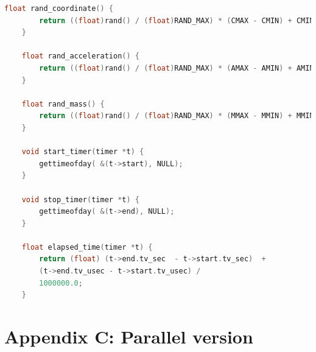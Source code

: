 \documentclass[10pt,a4paper]{article}
\begin{document}
\begin{lstlisting}[language=c]
	float rand_coordinate() {
		return ((float)rand() / (float)RAND_MAX) * (CMAX - CMIN) + CMIN;
	}
	
	float rand_acceleration() {
		return ((float)rand() / (float)RAND_MAX) * (AMAX - AMIN) + AMIN;
	}
	
	float rand_mass() { 
		return ((float)rand() / (float)RAND_MAX) * (MMAX - MMIN) + MMIN;
	}
	
	void start_timer(timer *t) {
		gettimeofday( &(t->start), NULL);
	}
	
	void stop_timer(timer *t) {
		gettimeofday( &(t->end), NULL);
	}
	
	float elapsed_time(timer *t) {
		return (float) (t->end.tv_sec  - t->start.tv_sec)  + 
		(t->end.tv_usec - t->start.tv_usec) /
		1000000.0;
	}
	\end{lstlisting}
	
	\section{Appendix C: Parallel version}
	
\end{document}
